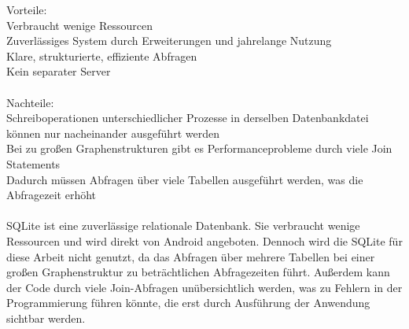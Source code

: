 Vorteile:\\
Verbraucht wenige Ressourcen\\
Zuverlässiges System durch Erweiterungen und jahrelange Nutzung\\
Klare, strukturierte, effiziente Abfragen\\
Kein separater Server\\\\
Nachteile: \\
Schreiboperationen unterschiedlicher Prozesse in derselben Datenbankdatei können nur nacheinander ausgeführt werden\\
Bei zu großen Graphenstrukturen gibt es Performanceprobleme durch viele Join Statements\\
Dadurch müssen Abfragen über viele Tabellen ausgeführt werden, was die Abfragezeit erhöht\\\\
SQLite ist eine zuverlässige relationale Datenbank. Sie verbraucht wenige Ressourcen und wird direkt von Android angeboten. Dennoch wird die SQLite für diese Arbeit nicht genutzt, da das Abfragen über mehrere Tabellen bei einer großen Graphenstruktur zu beträchtlichen Abfragezeiten führt. Außerdem kann der Code durch viele Join-Abfragen unübersichtlich werden, was zu Fehlern in der Programmierung führen könnte, die erst durch Ausführung der Anwendung sichtbar werden.



